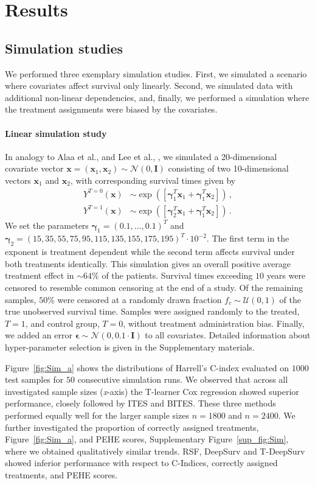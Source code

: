 \documentclass{article}
\newcommand{\myvec}[1]{\boldsymbol{#1}}
\begin{document}
	
	\section{Results}
	\subsection{Simulation studies}	
	We performed three exemplary simulation studies. First, we simulated a scenario where covariates affect survival only linearly. Second, we simulated data with additional non-linear dependencies, and, finally, we performed a simulation where the treatment assignments were biased by the covariates.
	
	\paragraph{Linear simulation study}
	In analogy to Alaa et al.,  and Lee et al., , we simulated a 20-dimensional covariate vector $\myvec{x}=(\myvec{x}_1,\myvec{x}_2)\sim \mathcal{N}(0,\myvec{I})$ consisting of two 10-dimensional vectors $\myvec{x}_1$ and $\myvec{x}_2$, with corresponding survival times given by
	\begin{align*}
	Y^{T=0}(\myvec{x})&\sim\exp\left(\left[\myvec{\gamma}_1^T\myvec{x}_1+\myvec{\gamma}_1^T\myvec{x}_2\right]\right)\,,\\
	Y^{T=1}(\myvec{x})&\sim\exp\left(\left[\myvec{\gamma}_2^T\myvec{x}_1+\myvec{\gamma}_1^T\myvec{x}_2\right]\right)\,.
	\end{align*}
	We set the parameters $\myvec{\gamma}_1=(0.1,\ldots,0.1)^T$ and $\myvec{\gamma}_2=(15, 35, 55, 75, 95,  115, 135, 155, 175,
	195)^T\cdot10^{-2}$. The first term in the exponent is treatment dependent while the second term affects survival under both treatments identically. This simulation gives an overall positive average treatment effect in $\sim 64\%$ of the patients. Survival times exceeding $10$ years were censored to resemble common censoring at the end of a study. Of the remaining samples, $50\%$ were censored at a randomly drawn fraction $f_c\sim \mathcal{U}(0,1)$ of the true unobserved survival time. Samples were assigned randomly to the treated, $T=1$, and control group, $ T =0$, without treatment administration bias. Finally, we added an error $\myvec{\epsilon}\sim\mathcal{N}(0,0.1\cdot\myvec{I})$ to all covariates. Detailed information about hyper-parameter selection is given in the Supplementary materials.
	
	Figure~\ref{fig:Sim_a} shows the distributions of Harrell's C-index evaluated on $1000$ test samples for $50$ consecutive simulation runs. We observed that across all investigated sample sizes (\textit{x}-axis) the T-learner Cox regression showed superior performance, closely followed by ITES and BITES. These three methods performed equally well for the larger sample sizes $n=1800$ and $n=2400$. We further investigated the proportion of correctly assigned treatments, Figure~\ref{fig:Sim_a}, and PEHE scores, Supplementary Figure~\ref{sup_fig:Sim}, where we obtained qualitatively similar trends. RSF, DeepSurv and T-DeepSurv showed inferior performance with respect to C-Indices, correctly assigned treatments, and PEHE scores.  
	
\end{document}
